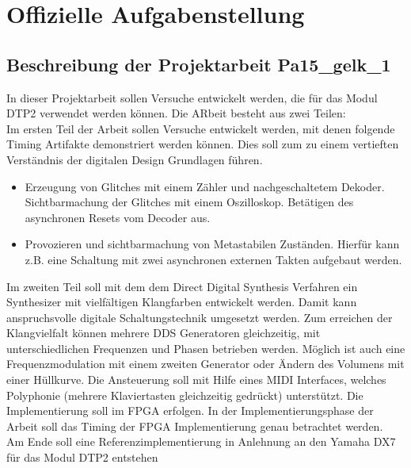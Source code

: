 


\appendix

\chapter{Offizielle Aufgabenstellung}\label{chap.anhang_aufgabenstellung}
\section*{Beschreibung der Projektarbeit Pa15\_gelk\_1}\label{sect.aufgabenstellung}

In dieser Projektarbeit sollen Versuche entwickelt werden, die für das Modul DTP2 verwendet werden können. Die ARbeit besteht aus zwei Teilen: \\
\newline
Im ersten Teil der Arbeit sollen Versuche entwickelt werden, mit denen folgende Timing Artifakte demonstriert werden können. Dies soll zum zu einem vertieften Verständnis der digitalen Design Grundlagen führen.
\newline
\begin{itemize}
	\item Erzeugung von Glitches mit einem Zähler und nachgeschaltetem Dekoder. Sichtbarmachung der Glitches mit einem Oszilloskop. Betätigen des asynchronen Resets vom Decoder aus. 

	\item Provozieren und sichtbarmachung von Metastabilen Zuständen. Hierfür kann z.B. eine Schaltung mit zwei asynchronen externen Takten aufgebaut werden. 
\end{itemize}
\newline
Im zweiten Teil soll mit dem dem Direct Digital Synthesis Verfahren ein Synthesizer mit vielfältigen Klangfarben entwickelt werden. Damit kann anspruchsvolle digitale Schaltungstechnik umgesetzt werden. Zum erreichen der Klangvielfalt können mehrere DDS Generatoren gleichzeitig, mit unterschiedlichen Frequenzen und Phasen betrieben werden. Möglich ist auch eine Frequenzmodulation mit einem zweiten Generator oder Ändern des Volumens mit einer Hüllkurve. Die Ansteuerung soll mit Hilfe eines MIDI Interfaces, welches Polyphonie (mehrere Klaviertasten gleichzeitig gedrückt) unterstützt. Die Implementierung soll im FPGA erfolgen. In der Implementierungsphase der Arbeit soll das Timing der FPGA Implementierung genau betrachtet werden. \\
Am Ende soll eine Referenzimplementierung in Anlehnung an den Yamaha DX7 für das Modul DTP2 entstehen 



